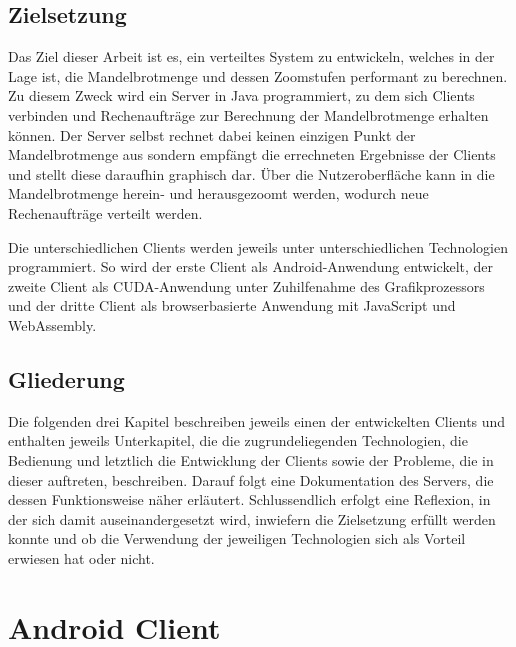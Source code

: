 \documentclass[12pt, onecolumn,notitlepage]{scrartcl}
\begin{document}
\subsection{Zielsetzung}
Das Ziel dieser Arbeit ist es, ein verteiltes System zu entwickeln, welches in der Lage ist, die Mandelbrotmenge und dessen Zoomstufen performant zu berechnen. Zu diesem Zweck wird ein Server in Java programmiert, zu dem sich Clients verbinden und Rechenaufträge zur Berechnung der Mandelbrotmenge erhalten können. Der Server selbst rechnet dabei keinen einzigen Punkt der Mandelbrotmenge aus sondern empfängt die errechneten Ergebnisse der Clients und stellt diese daraufhin graphisch dar. Über die Nutzeroberfläche kann in die Mandelbrotmenge herein- und herausgezoomt werden, wodurch neue Rechenaufträge verteilt werden.  \par
Die unterschiedlichen Clients werden jeweils unter unterschiedlichen Technologien programmiert. So wird der erste Client als Android-Anwendung entwickelt, der zweite Client als CUDA-Anwendung unter Zuhilfenahme des Grafikprozessors und der dritte Client als browserbasierte Anwendung mit JavaScript und WebAssembly. 
\subsection{Gliederung}
Die folgenden drei Kapitel beschreiben jeweils einen der entwickelten Clients und enthalten jeweils Unterkapitel, die die zugrundeliegenden Technologien, die Bedienung und letztlich die Entwicklung der Clients sowie der Probleme, die in dieser auftreten, beschreiben. Darauf folgt eine Dokumentation des Servers, die dessen Funktionsweise näher erläutert. Schlussendlich erfolgt eine Reflexion, in der sich damit auseinandergesetzt wird, inwiefern die Zielsetzung erfüllt werden konnte und ob die Verwendung der jeweiligen Technologien sich als Vorteil erwiesen hat oder nicht.


\section{Android Client}
\end{document}
